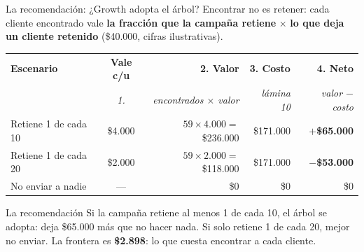 \documentclass{beamer}
\begin{document}
\begin{frame}{La recomendación: ¿Growth adopta el árbol?}
\small
Encontrar no es retener: cada cliente encontrado vale \textbf{la fracción que la campaña retiene} $\times$ \textbf{lo que deja un cliente retenido} (\$40.000, cifras ilustrativas).

\vspace{0.1cm}
\begin{center}
\scriptsize
\setlength{\tabcolsep}{5pt}
\begin{tabular}{@{}l c r r r@{}}
\toprule
\textbf{Escenario} & \textbf{Vale c/u} & \textbf{2. Valor} & \textbf{3. Costo} & \textbf{4. Neto} \\
 & \textit{1.} & \textit{encontrados $\times$ valor} & \textit{lámina 10} & \textit{valor $-$ costo} \\
\midrule
Retiene 1 de cada 10 & \$4.000 & $59 \times 4.000 =$ \$236.000 & \$171.000 & \textbf{$+$\$65.000} \\
Retiene 1 de cada 20 & \$2.000 & $59 \times 2.000 =$ \$118.000 & \$171.000 & \textbf{$-$\$53.000} \\
No enviar a nadie & --- & \$0 & \$0 & \$0 \\
\bottomrule
\end{tabular}
\end{center}
\pause
\begin{alertblock}{La recomendación}
Si la campaña retiene al menos 1 de cada 10, el árbol se adopta: deja \$65.000 más que no hacer nada. Si solo retiene 1 de cada 20, mejor no enviar. La frontera es \textbf{\$2.898}: lo que cuesta encontrar a cada cliente.
\end{alertblock}
\end{frame}
\end{document}
